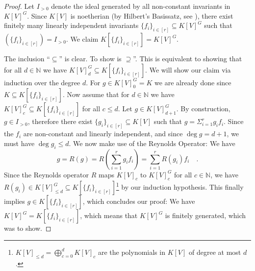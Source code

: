 \begin{proof}
  Let $I_{>0}$ denote the ideal generated by all non-constant invariants in $K[V]^G$.
  Since $K[V]$ is noetherian (by Hilbert's Basissatz, see \cite[p.~131]{Bos13}), there exist finitely many linearly independent invariants $\{f_i\}_{i \in [r]} \subseteq K[V]^G$ such that $ \left( \{f_i\}_{i \in [r]} \right) = I_{>0} $.
  We claim $K[\{f_i\}_{i \in [r]}] = K[V]^G$.
  
  The inclusion ``$\subseteq$'' is clear.
  To show is $\supseteq$''.
  This is equivalent to showing that for all $d \in \mathbb{N}$ we have $K[V]^G_{d} \subseteq K[\{f_i\}_{i \in [r]}] $.
  We will show our claim via induction over the degree $d$.
  For $g \in K[V]^G_{0} = K$ we are already done since $K \subseteq K[\{f_i\}_{i \in [r]}]$.
  Now assume that for $d \in \mathbb{N}$ we have $K[V]^G_{c} \subseteq K[\{f_i\}_{i \in [r]}]$ for all $c \leq d$.
  Let $g \in K[V]^G_{ d+1}$.
  By construction, $g \in I_{>0}$, therefore there exist $\{g_i\}_{i \in [r]} \subseteq K[V]$ such that $g = \Sigma_{i=1}^r g_i f_i$.
  Since the $f_i$ are non-constant and linearly independent, and since $\operatorname{deg} g = d+1$, we must have $ \operatorname{deg} g_i \leq d $.
  We now make use of the Reynolds Operator:  We have
  \begin{equation*}
      g = R(g)
      =  R \left( \sum_{i=1}^r g_i f_i \right)
      = \sum_{i=1}^r R( g_i) f_i \quad .
  \end{equation*}
  Since the Reynolds operator $R$ maps $K[V]_{c}$ to $K[V]^G_{c}$ for all $c \in \mathbb{N}$, we have \linebreak$R(g_i) \in K[V]_{\leq d}^G \subseteq K[\{f_i\}_{i \in [r]}]$\footnote{$K[V]_{\leq d} = \bigoplus_{c=0}^d K[V]_c$ are the polynomials in $K[V]$ of degree at most $d$.} by our induction hypothesis.
  This finally implies $ g \in K[\{f_i\}_{i \in [r]}]$, which concludes our proof:
  We have $K[V]^G = K[\{f_i\}_{i \in [r]}]$, which means that $K[V]^G$ is finitely generated, which was to show.
\end{proof}

